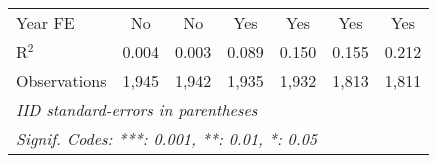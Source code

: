 \begin{table}[htbp]
\begin{tabular}{lcccccc}
      Year FE        & No                           & No                & Yes                          & Yes               & Yes                          & Yes\\  
      R$^2$          & 0.004                        & 0.003             & 0.089                        & 0.150             & 0.155                        & 0.212\\  
      Observations   & 1,945                        & 1,942             & 1,935                        & 1,932             & 1,813                        & 1,811\\  
      \midrule \midrule
      \multicolumn{7}{l}{\emph{IID standard-errors in parentheses}}\\
      \multicolumn{7}{l}{\emph{Signif. Codes: ***: 0.001, **: 0.01, *: 0.05}}\\
   \end{tabular}
\end{table}


